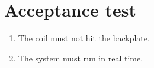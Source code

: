 \chapter{Acceptance test}




\begin{enumerate}
\item [\textlabel{1}{coil}] The coil must not hit the backplate.\\
\item [\textlabel{2}{realtime}] The system must run in real time.
\end{enumerate}
